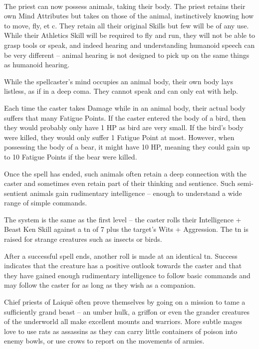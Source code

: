 \begin{multicols}{2}
\spelllevel

\\
The priest can now possess animals, taking their body. The priest retains their own Mind Attributes but takes on those of the animal, instinctively knowing how to move, fly, et c. They retain all their original Skills but few will be of any use. While their Athletics Skill will be required to fly and run, they will not be able to grasp tools or speak, and indeed hearing and understanding humanoid speech can be very different -- animal hearing is not designed to pick up on the same things as humanoid hearing.

While the spellcaster's mind occupies an animal body, their own body lays listless, as if in a deep coma. They cannot speak and can only eat with help.

Each time the caster takes Damage while in an animal body, their actual body suffers that many Fatigue Points. If the caster entered the body of a bird, then they would probably only have 1 HP as bird are very small. If the bird's body were killed, they would only suffer 1 Fatigue Point at most. However, when possessing the body of a bear, it might have 10 HP, meaning they could gain up to 10 Fatigue Points if the bear were killed.

Once the spell has ended, such animals often retain a deep connection with the caster and sometimes even retain part of their thinking and sentience. Such semi-sentient animals gain rudimentary intelligence -- enough to understand a wide range of simple commands.

The system is the same as the first level -- the caster rolls their Intelligence + Beast Ken Skill against a \gls{tn} of 7 plus the target's Wits + Aggression. The \gls{tn} is raised for strange creatures such as insects or birds.

After a successful spell ends, another roll is made at an identical \gls{tn}. Success indicates that the creature has a positive outlook towards the caster and that they have gained enough rudimentary intelligence to follow basic commands and may follow the caster for as long as they wish as a companion.

Chief priests of Laiqu\"{e} often prove themselves by going on a mission to tame a sufficiently grand beast -- an umber hulk, a griffon or even the grander creatures of the underworld all make excellent mounts and warriors. More subtle mages love to use rats as assassins as they can carry little containers of poison into enemy bowls, or use crows to report on the movements of armies.


\end{multicols}
